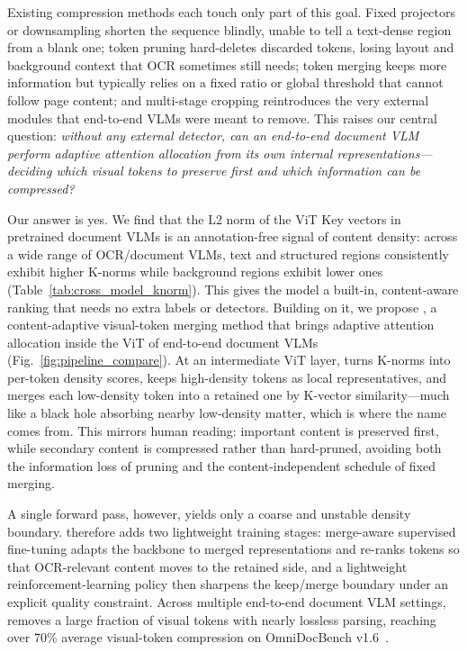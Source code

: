 Existing compression methods each touch only part of this goal. Fixed projectors or downsampling shorten the sequence blindly, unable to tell a text-dense region from a blank one; token pruning hard-deletes discarded tokens, losing layout and background context that OCR sometimes still needs; token merging keeps more information but typically relies on a fixed ratio or global threshold that cannot follow page content; and multi-stage cropping reintroduces the very external modules that end-to-end VLMs were meant to remove. This raises our central question: \emph{without any external detector, can an end-to-end document VLM perform adaptive attention allocation from its own internal representations---deciding which visual tokens to preserve first and which information can be compressed?}

Our answer is yes. We find that the L2 norm of the ViT Key vectors in pretrained document VLMs is an annotation-free signal of content density: across a wide range of OCR/document VLMs, text and structured regions consistently exhibit higher K-norms while background regions exhibit lower ones (Table~\ref{tab:cross_model_knorm}). This gives the model a built-in, content-aware ranking that needs no extra labels or detectors. Building on it, we propose \ours{}, a content-adaptive visual-token merging method that brings adaptive attention allocation inside the ViT of end-to-end document VLMs (Fig.~\ref{fig:pipeline_compare}). At an intermediate ViT layer, \ours{} turns K-norms into per-token density scores, keeps high-density tokens as local representatives, and merges each low-density token into a retained one by K-vector similarity---much like a black hole absorbing nearby low-density matter, which is where the name comes from. This mirrors human reading: important content is preserved first, while secondary content is compressed rather than hard-pruned, avoiding both the information loss of pruning and the content-independent schedule of fixed merging.

A single forward pass, however, yields only a coarse and unstable density boundary. \ours{} therefore adds two lightweight training stages: merge-aware supervised fine-tuning adapts the backbone to merged representations and re-ranks tokens so that OCR-relevant content moves to the retained side, and a lightweight reinforcement-learning policy then sharpens the keep/merge boundary under an explicit quality constraint. Across multiple end-to-end document VLM settings, \ours{} removes a large fraction of visual tokens with nearly lossless parsing, reaching over 70\% average visual-token compression on OmniDocBench v1.6~\cite{ouyang2025omnidocbench}.
